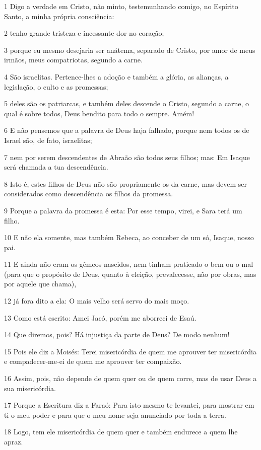 \par 1 Digo a verdade em Cristo, não minto, testemunhando comigo, no Espírito Santo, a minha própria consciência:
\par 2 tenho grande tristeza e incessante dor no coração;
\par 3 porque eu mesmo desejaria ser anátema, separado de Cristo, por amor de meus irmãos, meus compatriotas, segundo a carne.
\par 4 São israelitas. Pertence-lhes a adoção e também a glória, as alianças, a legislação, o culto e as promessas;
\par 5 deles são os patriarcas, e também deles descende o Cristo, segundo a carne, o qual é sobre todos, Deus bendito para todo o sempre. Amém!
\par 6 E não pensemos que a palavra de Deus haja falhado, porque nem todos os de Israel são, de fato, israelitas;
\par 7 nem por serem descendentes de Abraão são todos seus filhos; mas: Em Isaque será chamada a tua descendência.
\par 8 Isto é, estes filhos de Deus não são propriamente os da carne, mas devem ser considerados como descendência os filhos da promessa.
\par 9 Porque a palavra da promessa é esta: Por esse tempo, virei, e Sara terá um filho.
\par 10 E não ela somente, mas também Rebeca, ao conceber de um só, Isaque, nosso pai.
\par 11 E ainda não eram os gêmeos nascidos, nem tinham praticado o bem ou o mal (para que o propósito de Deus, quanto à eleição, prevalecesse, não por obras, mas por aquele que chama),
\par 12 já fora dito a ela: O mais velho será servo do mais moço.
\par 13 Como está escrito: Amei Jacó, porém me aborreci de Esaú.
\par 14 Que diremos, pois? Há injustiça da parte de Deus? De modo nenhum!
\par 15 Pois ele diz a Moisés: Terei misericórdia de quem me aprouver ter misericórdia e compadecer-me-ei de quem me aprouver ter compaixão.
\par 16 Assim, pois, não depende de quem quer ou de quem corre, mas de usar Deus a sua misericórdia.
\par 17 Porque a Escritura diz a Faraó: Para isto mesmo te levantei, para mostrar em ti o meu poder e para que o meu nome seja anunciado por toda a terra.
\par 18 Logo, tem ele misericórdia de quem quer e também endurece a quem lhe apraz.

